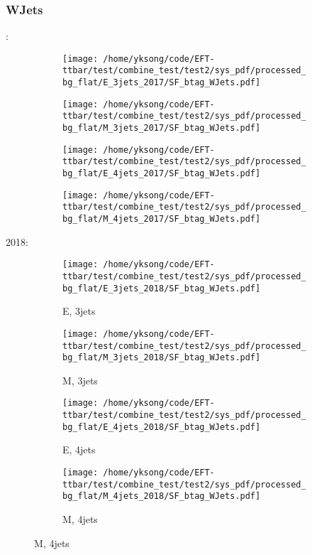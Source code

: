 \documentclass{beamer}
\begin{document}
\begin{frame}
\frametitle{WJets}
\fontsize{5}{1}:
\begin{figure}
\centering
\begin{subfigure}[b]{0.24\textwidth}
\texttt{[image: /home/yksong/code/EFT-ttbar/test/combine\_test/test2/sys\_pdf/processed\_bg\_flat/E\_3jets\_2017/SF\_btag\_WJets.pdf]}
\end{subfigure}
\begin{subfigure}[b]{0.24\textwidth}
\texttt{[image: /home/yksong/code/EFT-ttbar/test/combine\_test/test2/sys\_pdf/processed\_bg\_flat/M\_3jets\_2017/SF\_btag\_WJets.pdf]}
\end{subfigure}
\begin{subfigure}[b]{0.24\textwidth}
\texttt{[image: /home/yksong/code/EFT-ttbar/test/combine\_test/test2/sys\_pdf/processed\_bg\_flat/E\_4jets\_2017/SF\_btag\_WJets.pdf]}
\end{subfigure}
\begin{subfigure}[b]{0.24\textwidth}
\texttt{[image: /home/yksong/code/EFT-ttbar/test/combine\_test/test2/sys\_pdf/processed\_bg\_flat/M\_4jets\_2017/SF\_btag\_WJets.pdf]}
\end{subfigure}
\end{figure}
2018:
\begin{figure}
\centering
\begin{subfigure}[b]{0.24\textwidth}
\texttt{[image: /home/yksong/code/EFT-ttbar/test/combine\_test/test2/sys\_pdf/processed\_bg\_flat/E\_3jets\_2018/SF\_btag\_WJets.pdf]}
\captionsetup{font=tiny}
\caption{E, 3jets}
\end{subfigure}
\begin{subfigure}[b]{0.24\textwidth}
\texttt{[image: /home/yksong/code/EFT-ttbar/test/combine\_test/test2/sys\_pdf/processed\_bg\_flat/M\_3jets\_2018/SF\_btag\_WJets.pdf]}
\captionsetup{font=tiny}
\caption{M, 3jets}
\end{subfigure}
\begin{subfigure}[b]{0.24\textwidth}
\texttt{[image: /home/yksong/code/EFT-ttbar/test/combine\_test/test2/sys\_pdf/processed\_bg\_flat/E\_4jets\_2018/SF\_btag\_WJets.pdf]}
\captionsetup{font=tiny}
\caption{E, 4jets}
\end{subfigure}
\begin{subfigure}[b]{0.24\textwidth}
\texttt{[image: /home/yksong/code/EFT-ttbar/test/combine\_test/test2/sys\_pdf/processed\_bg\_flat/M\_4jets\_2018/SF\_btag\_WJets.pdf]}
\captionsetup{font=tiny}
\caption{M, 4jets}
\end{subfigure}
\end{figure}
\end{frame}
\end{document}
